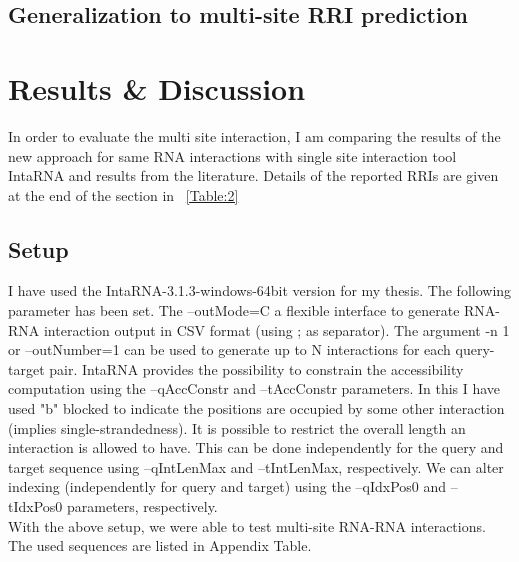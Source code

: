 \documentclass[twoside,a4paper]{report}
\begin{document}
	\section{Generalization to multi-site RRI prediction}
	
	\chapter{Results \& Discussion}
	
	In order to evaluate the multi site interaction, I am comparing the results of the new approach for same RNA interactions with single site interaction tool IntaRNA and results from the literature. Details of the reported RRIs are given at the end of the section in ~\ref{Table:2} \\ 
	
	
	\section{Setup}
	
	I have used the IntaRNA-3.1.3-windows-64bit version for my thesis. The following parameter has been set. The --outMode=C a flexible interface to generate RNA-RNA interaction output in CSV format (using ; as separator). The argument -n 1 or --outNumber=1 can be used to generate up to N interactions for each query-target pair. IntaRNA provides the possibility to constrain the accessibility computation using the --qAccConstr and --tAccConstr parameters. In this I have used "b" blocked to indicate the positions are occupied by some other interaction (implies single-strandedness).  It is possible to restrict the overall length an interaction is allowed to have. This can be done independently for the query and target sequence using --qIntLenMax and --tIntLenMax, respectively. We can alter indexing (independently for query and target) using the --qIdxPos0 and --tIdxPos0 parameters, respectively.\\
	
	
	With the above setup, we were able to test multi-site RNA-RNA interactions. The used sequences are listed in Appendix Table.\\
	
%	
	
		
		
\end{document}
